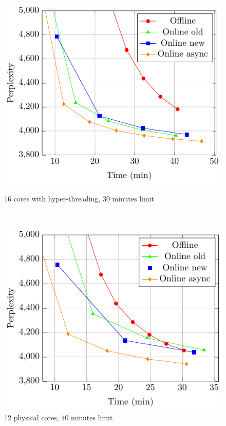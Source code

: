 \documentclass[russian,english]{llncs}
\begin{document}
\begin{figure}[t]
	\centering
	\begin{minipage}[b]{0.4\textwidth}
		\includegraphics[scale=0.65]{plots/perplexity_time_plot_12.pdf}
		\caption{16 cores with hyper-threading, 30 minutes limit} \label{fig:compare16}
	\end{minipage}
	$\qquad\quad$
	\begin{minipage}[b]{0.4\textwidth}
		\includegraphics[scale=0.65]{plots/perplexity_time_plot_16.pdf}
		\caption{12 physical cores, 40 minutes limit} \label{fig:compare12}
	\end{minipage}
\end{figure}
\end{document}
